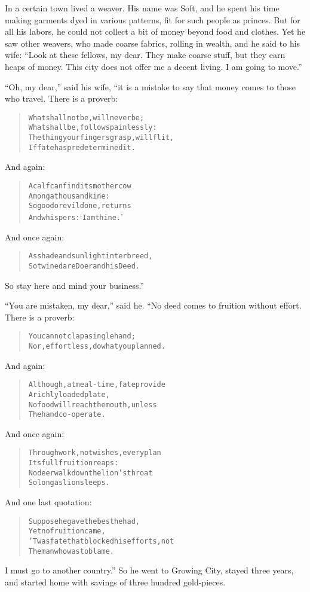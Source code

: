 \documentclass[article, twoside, 14pt]{memoir}
\renewenvironment{verbatim}{%
\begin{quote}%
\vskip -10pt%
\begin{alltt}\normalfont\large}{\end{alltt}%
\end{quote}%
\vskip -10pt
} %
\begin{document}
In a certain town lived a weaver. His name was Soft, and he spent
his time making garments dyed in various patterns, fit for such
people as princes. But for all his labors, he could not collect a
bit of money beyond food and clothes. Yet he saw other weavers, who
made coarse fabrics, rolling in wealth, and he said to his wife:
``Look at these fellows, my dear. They make coarse stuff, but they earn heaps of money. This city does not offer me a decent living. I am going to move.''

``Oh, my dear,'' said his wife, “it is a mistake to say that money
comes to those who travel. There is a proverb:

\begin{verbatim}
What shall not be, will never be;
What shall be, follows painlessly:
The thing your fingers grasp, will flit,
If fate has predetermined it.
\end{verbatim}
And again:

\begin{verbatim}
A calf can find its mother cow
    Among a thousand kine:
So good or evil done, returns
    And whispers: ‘I am thine.’
\end{verbatim}
And once again:

\begin{verbatim}
As shade and sunlight interbreed,
So twined are Doer and his Deed.
\end{verbatim}
So stay here and mind your business.”

``You are mistaken, my dear,'' said he. “No deed comes to fruition
without effort. There is a proverb:

\begin{verbatim}
You cannot clap a single hand;
Nor, effortless, do what you planned.
\end{verbatim}
And again:

\begin{verbatim}
Although, at meal-time, fate provide
    A richly loaded plate,
No food will reach the mouth, unless
    The hand co-operate.
\end{verbatim}
And once again:

\begin{verbatim}
Through work, not wishes, every plan
    Its full fruition reaps:
No deer walk down the lion's throat
    So long as lion sleeps.
\end{verbatim}
And one last quotation:

\begin{verbatim}
Suppose he gave the best he had,
    Yet no fruition came,
'Twas fate that blocked his efforts, not
    The man who was to blame.
\end{verbatim}
I must go to another country.” So he went to Growing City, stayed
three years, and started home with savings of three hundred
gold-pieces.
\end{document}
